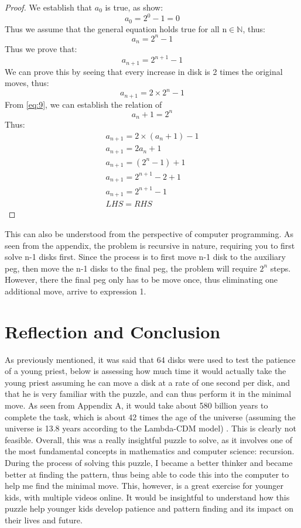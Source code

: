 \documentclass[12pt,a4paper]{article}
\begin{document}
	\begin{proof}
	We establish that $a_0$ is true, as show:
	\begin{equation}
	    a_0 = 2^0 -1 =0
	\end{equation}
	Thus we assume that the general equation holds true for all n$\in \mathbb{N}$, thus:
	\begin{equation}\label{eq:9}
	    a_n = 2^n -1
	\end{equation}
	Thus we prove that:
	\begin{equation}
	    a_{n+1} = 2^{n+1} -1
	\end{equation}
	We can prove this by seeing that every increase in disk is 2 times the original moves, thus:
	\begin{equation}
	    a_{n+1} = 2\times 2^{n} -1
	\end{equation}
	From \ref{eq:9}, we can establish the relation of 
	\[ a_n +1 = 2^n \]
	Thus:
	\begin{align*}
	    a_{n+1} = 2\times (a_n+1)-1 \\
	    a_{n+1} = 2a_n +1\\
	    a_{n+1} = (2^n-1)+1\\
	    a_{n+1} = 2^{n+1} -2+1\\
	    a_{n+1} = 2^{n+1}-1\\
	    LHS=RHS
	\end{align*}
	\end{proof}
	\noindent This can also be understood from the perspective of computer programming. As seen from the appendix, the problem is recursive in nature, requiring you to first solve n-1 disks first. Since the process is to first move n-1 disk to the auxiliary peg, then move the n-1 disks to the final peg, the problem will require $2^{n}$ steps. However, there the final peg only has to be move once, thus eliminating one additional move, arrive to expression 1. 
	\section{Reflection and Conclusion}
	As previously mentioned, it was said that 64 disks were used to test the patience of a young priest, below is assessing how much time it would actually take the young priest assuming he can move a disk at a rate of one second per disk, and that he is very familiar with the puzzle, and can thus perform it in the minimal move. As seen from Appendix A, it would take about 580 billion years to complete the task, which is about 42 times the age of the universe (assuming the universe is 13.8 years according to the Lambda-CDM model) \cite{Shu}. This is clearly not feasible. \newline\newline
	Overall, this was a really insightful puzzle to solve, as it involves one of the most fundamental concepts in mathematics and computer science: recursion. During the process of solving this puzzle, I became a better thinker and became better at finding the pattern, thus being able to code this into the computer to help me find the minimal move. This, however, is a great exercise for younger kids, with multiple videos online. It would be insightful to understand how this puzzle help younger kids develop patience and pattern finding and its impact on their lives and future. 
	\printbibliography
\end{document}
